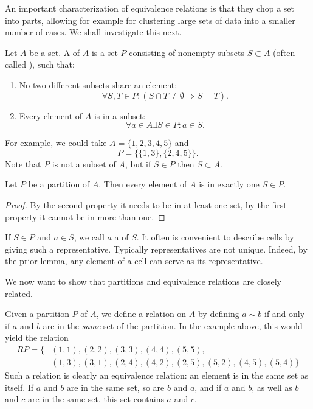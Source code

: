 An important characterization of equivalence relations is that they chop a
set into parts, allowing for example for clustering large sets of data into
a smaller number of cases. We shall investigate this next.
\begin{defn}
Let $A$ be a set. A  of $A$ is a set $P$ consisting of nonempty
subsets $S\subset A$ (often called ), such that:
\begin{enumerate}
\item No two different subsets share an element:
\[
\forall S,T\in P: (S\cap T\not=\emptyset\Rightarrow S=T).
\]
\item Every element of $A$ is in a subset: 
\[
\forall a\in A\exists S\in P: a\in S.
\]
\end{enumerate}
\end{defn}
For example, we could take $A=\{1,2,3,4,5\}$ and 
\[
P=\{\{1,3\},\{2,4,5\}\}.
\]
Note that $P$ is not a subset of $A$, but if $S\in P$ then $S\subset A$.

\begin{lemma}
Let $P$ be a partition of $A$. Then every element of $A$ is in exactly one $S\in P$.
\end{lemma}
\begin{proof}
By the second property it needs to be in at least one set, by the first property it
cannot be in more than one.
\end{proof}

If $S\in P$ and $a\in S$, we call $a$ a  of $S$.  It often is
convenient to describe cells by giving such a representative.
Typically representatives are not unique. Indeed, by the prior lemma, any
element of a cell can serve as its representative.
\bigskip

We now want to show that partitions and equivalence relations are closely related.

Given a partition $P$ of $A$, we define a relation on $A$ by
defining $a\sim b$ if and only if $a$ and $b$ are in the {\em same} set of
the partition. In the example above, this would yield the relation
\[
\begin{split}
RP=\{&(1,1),(2,2),(3,3),(4,4),(5,5),\\
&(1,3),(3,1),(2,4),(4,2),(2,5),(5,2),(4,5),(5,4)\}
\end{split}
\]
Such a relation is clearly an equivalence relation: an element is in the
same set as itself. If $a$ and $b$ are in the same set, so are $b$ and $a$,
and if $a$ and $b$, as well as $b$ and $c$ are in the same set, this set
contains $a$ and $c$.

